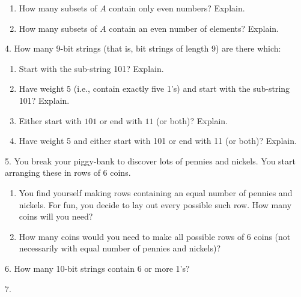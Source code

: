 \documentclass[10pt,]{book}
\theoremstyle{plain}
\theoremstyle{definition}
\theoremstyle{definition}
\theoremstyle{definition}
\theoremstyle{definition}
\numberwithin{equation}{chapter}
\begin{document}
\begin{exerciselist}
\begin{enumerate}[label=(\alph*)]
\item\hypertarget{li-398}{}\hypertarget{p-850}{}%
How many subsets of \(A\) contain only even numbers? Explain. %
\item\hypertarget{li-399}{}\hypertarget{p-851}{}%
How many subsets of \(A\) contain an even number of elements? Explain. %
\end{enumerate}
%
\par\smallskip
\item[4.]\hypertarget{exercise-101}{}\hypertarget{p-852}{}%
How many \(9\)-bit strings (that is, bit strings of length 9) are there which: \leavevmode%
\begin{enumerate}[label=(\alph*)]
\item\hypertarget{li-400}{}\hypertarget{p-853}{}%
Start with the sub-string 101? Explain. %
\item\hypertarget{li-401}{}\hypertarget{p-854}{}%
Have weight 5 (i.e., contain exactly five 1's) and start with the sub-string 101? Explain. %
\item\hypertarget{li-402}{}\hypertarget{p-855}{}%
Either start with \(101\) or end with \(11\) (or both)? Explain. %
\item\hypertarget{li-403}{}\hypertarget{p-856}{}%
Have weight 5 and either start with 101 or end with 11 (or both)? Explain. %
\end{enumerate}
%
\par\smallskip
\item[5.]\hypertarget{exercise-102}{}\hypertarget{p-857}{}%
You break your piggy-bank to discover lots of pennies and nickels. You start arranging these in rows of 6 coins. \leavevmode%
\begin{enumerate}[label=(\alph*)]
\item\hypertarget{li-404}{}\hypertarget{p-858}{}%
You find yourself making rows containing an equal number of pennies and nickels.  For fun, you decide to lay out every possible such row.  How many coins will you need?%
\item\hypertarget{li-405}{}\hypertarget{p-859}{}%
How many coins would you need to make all possible rows of 6 coins (not necessarily with equal number of pennies and nickels)?%
\end{enumerate}
%
\par\smallskip
\item[6.]\hypertarget{exercise-103}{}\hypertarget{p-863}{}%
How many 10-bit strings contain 6 or more 1's?%
\par\smallskip
\item[7.]\hypertarget{exercise-104}{}\hypertarget{p-865}{}%

\end{exerciselist}
\end{document}
